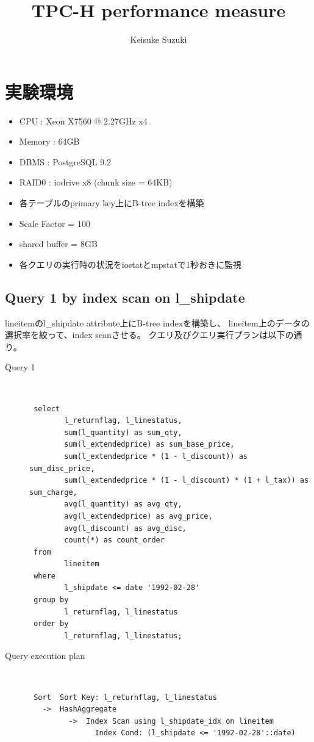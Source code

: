 \documentclass[11pt,a4paper]{jsarticle}
\title{TPC-H performance measure}
\author{Keisuke Suzuki}
\begin{document}
\maketitle
\section{実験環境}
\begin{itemize}
 \item CPU : Xeon X7560 @ 2.27GHz x4
 \item Memory : 64GB
 \item DBMS : PostgreSQL 9.2
 \item RAID0 : iodrive x8 (chunk size = 64KB)
 \item 各テーブルのprimary key上にB-tree indexを構築
 \item Scale Factor = 100
 \item shared buffer = 8GB
 \item 各クエリの実行時の状況をiostatとmpstatで1秒おきに監視
\end{itemize}

\clearpage
\subsection{Query 1 by index scan on l\_shipdate}
lineitemのl\_shipdate attribute上にB-tree indexを構築し、
lineitem上のデータの選択率を絞って、index scanさせる。
クエリ及びクエリ実行プランは以下の通り。
\begin{description}
 \item[Query 1]\mbox{}\\
 \begin{verbatim}
 select
        l_returnflag, l_linestatus,
        sum(l_quantity) as sum_qty,
        sum(l_extendedprice) as sum_base_price,
        sum(l_extendedprice * (1 - l_discount)) as sum_disc_price,
        sum(l_extendedprice * (1 - l_discount) * (1 + l_tax)) as sum_charge,
        avg(l_quantity) as avg_qty,
        avg(l_extendedprice) as avg_price,
        avg(l_discount) as avg_disc,
        count(*) as count_order
 from
        lineitem
 where
        l_shipdate <= date '1992-02-28'
 group by
        l_returnflag, l_linestatus
 order by
        l_returnflag, l_linestatus;
 \end{verbatim}
 \item[Query execution plan]\mbox{}\\
 \small{
 \begin{verbatim}
 Sort  Sort Key: l_returnflag, l_linestatus
   ->  HashAggregate
         ->  Index Scan using l_shipdate_idx on lineitem
               Index Cond: (l_shipdate <= '1992-02-28'::date)
 \end{verbatim}
 }
\end{description}
\end{document}
